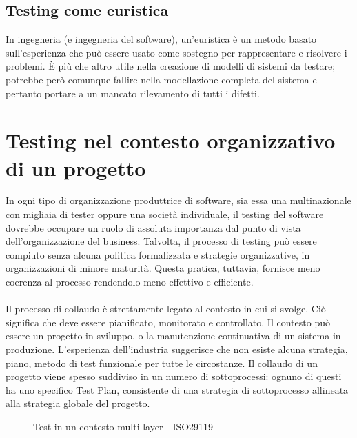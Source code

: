 \subsection{Testing come euristica}
In ingegneria (e ingegneria del software), un'euristica è un metodo basato sull'esperienza che può essere usato come sostegno per rappresentare e risolvere i problemi. È più che altro utile nella creazione di modelli di sistemi da testare; potrebbe però comunque fallire nella modellazione completa del sistema e pertanto portare a un mancato rilevamento di tutti i difetti.\cite{iso29119}
\section{Testing nel contesto organizzativo di un progetto}
In ogni tipo di organizzazione produttrice di software, sia essa una multinazionale con migliaia di tester oppure una società individuale, il testing del software dovrebbe occupare un ruolo di assoluta importanza dal punto di vista dell'organizzazione del business.
Talvolta, il processo di testing può essere compiuto senza alcuna politica formalizzata e strategie organizzative, in organizzazioni di minore maturità. Questa pratica, tuttavia, fornisce meno coerenza al processo rendendolo meno effettivo e efficiente.
\cite{iso29119}\paragraph{}
Il processo di collaudo è strettamente legato al contesto in cui si svolge. Ciò significa che deve essere pianificato, monitorato e controllato.
Il contesto può essere un progetto in sviluppo, o la manutenzione continuativa di un sistema in produzione. L'esperienza dell'industria suggerisce che non esiste alcuna strategia, piano, metodo di test funzionale per tutte le circostanze.
Il collaudo di un progetto viene spesso suddiviso in un numero di sottoprocessi: ognuno di questi ha uno specifico Test Plan, consistente di una strategia di sottoprocesso allineata alla strategia globale del progetto.\cite{iso29119}
\begin{figure}[H]
\centering
{}
\caption{Test in un contesto multi-layer - ISO29119\cite{iso29119}}\label{fig:2}
\end{figure}
